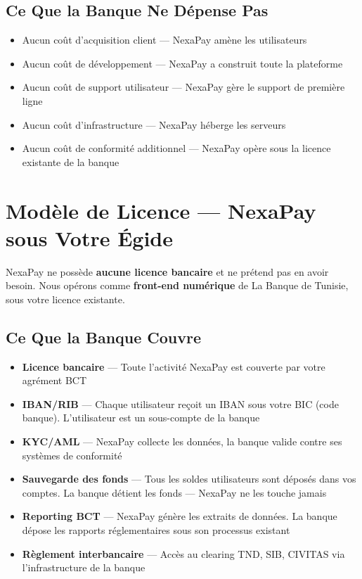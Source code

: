\documentclass[11pt,a4paper]{article}
\begin{document}
\subsection{Ce Que la Banque Ne D\'epense Pas}

\begin{itemize}[leftmargin=*]
    \item Aucun co\^ut d'acquisition client --- NexaPay am\`ene les utilisateurs
    \item Aucun co\^ut de d\'eveloppement --- NexaPay a construit toute la plateforme
    \item Aucun co\^ut de support utilisateur --- NexaPay g\`ere le support de premi\`ere ligne
    \item Aucun co\^ut d'infrastructure --- NexaPay h\'eberge les serveurs
    \item Aucun co\^ut de conformit\'e additionnel --- NexaPay op\`ere sous la licence existante de la banque
\end{itemize}

\newpage

\section{Mod\`ele de Licence --- NexaPay sous Votre \'Egide}

NexaPay ne poss\`ede \textbf{aucune licence bancaire} et ne pr\'etend pas en avoir besoin. Nous op\'erons comme \textbf{front-end num\'erique} de La Banque de Tunisie, sous votre licence existante.

\subsection{Ce Que la Banque Couvre}

\begin{itemize}[leftmargin=*]
    \item \textbf{Licence bancaire} --- Toute l'activit\'e NexaPay est couverte par votre agrément BCT
    \item \textbf{IBAN/RIB} --- Chaque utilisateur re\c{c}oit un IBAN sous votre BIC (code banque). L'utilisateur est un sous-compte de la banque
    \item \textbf{KYC/AML} --- NexaPay collecte les donn\'ees, la banque valide contre ses syst\`emes de conformit\'e
    \item \textbf{Sauvegarde des fonds} --- Tous les soldes utilisateurs sont d\'epos\'es dans vos comptes. La banque d\'etient les fonds --- NexaPay ne les touche jamais
    \item \textbf{Reporting BCT} --- NexaPay g\'en\`ere les extraits de donn\'ees. La banque d\'epose les rapports r\'eglementaires sous son processus existant
    \item \textbf{R\`eglement interbancaire} --- Acc\`es au clearing TND, SIB, CIVITAS via l'infrastructure de la banque
\end{itemize}
\end{document}
